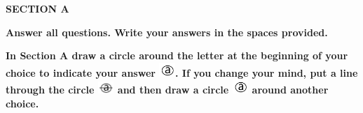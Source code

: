 \documentclass{article}
\date{}
\begin{document}
\fontsize{13}{17} \selectfont %
\setcounter{page}{2}

\begin{center}
    \textbf{SECTION A} \\

    \vspace{10pt}

    \textbf{Answer all questions. Write your answers in the spaces provided. } \\

    \vspace{10pt}

   \textbf{ In Section A draw a circle around the letter at the beginning of your choice to indicate your answer \includegraphics[width=0.6cm]{Exams/a_circle.png}. If you change your mind, put a line through the circle \includegraphics[width=0.6cm]{Exams/a_circle_crossed.png} and then draw a circle \includegraphics[width=0.6cm]{Exams/a_circle.png} around another choice. }
  
\end{center}

\vspace{5pt}
\end{document}

